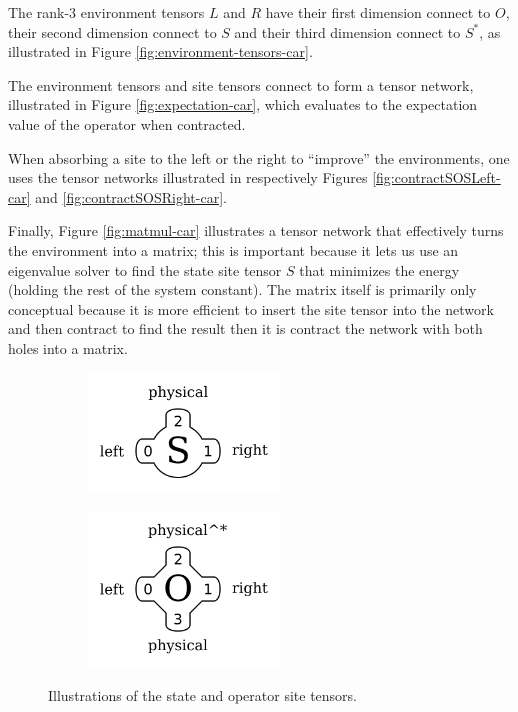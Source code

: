 \documentclass{article}
\begin{document}
The rank-3 environment tensors $L$ and $R$ have their first dimension connect to $O$, their second dimension connect to $S$ and their third dimension connect to $S^* $, as illustrated in Figure \ref{fig:environment-tensors-car}.

The environment tensors and site tensors connect to form a tensor network, illustrated in Figure \ref{fig:expectation-car}, which evaluates to the expectation value of the operator when contracted.

When absorbing a site to the left or the right to ``improve'' the environments, one uses the tensor networks illustrated in respectively Figures \ref{fig:contractSOSLeft-car} and \ref{fig:contractSOSRight-car}.

Finally, Figure \ref{fig:matmul-car} illustrates a tensor network that effectively turns the environment into a matrix;  this is important because it lets us use an eigenvalue solver to find the state site tensor $S$ that minimizes the energy (holding the rest of the system constant).  The matrix itself is primarily only conceptual because it is more efficient to insert the site tensor into the network and then contract to find the result then it is contract the network with both holes into a matrix.

\begin{figure}
\centering
\begin{subfigure}{2in}
\includegraphics[width=2in]{drawings/state_site_tensor-car}
\end{subfigure}
\begin{subfigure}{2in}
\includegraphics[width=2in]{drawings/operator_site_tensor-car}
\end{subfigure}
\caption{\label{fig:site-tensors-car} Illustrations of the state and operator site tensors.}
\end{figure}
\end{document}
